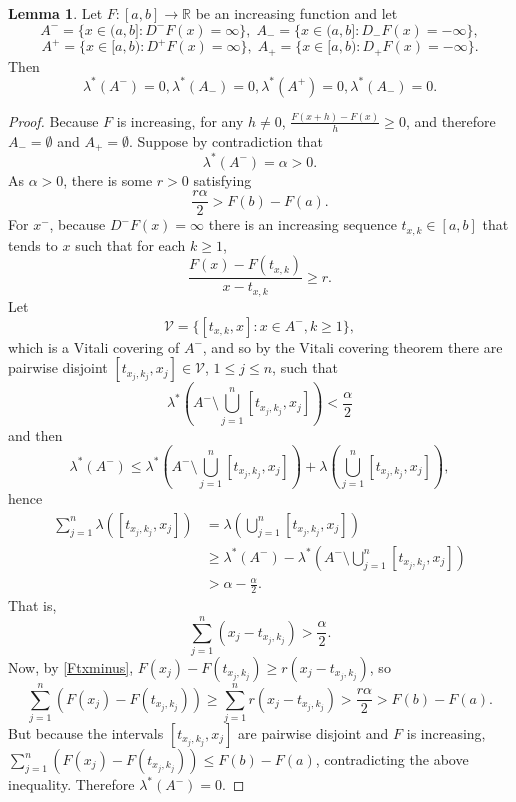 \documentclass{article}
\theoremstyle{definition}
\newtheorem{lemma}[theorem]{Lemma}
\theoremstyle{definition}
\begin{document}
\begin{lemma}
Let $F:[a,b] \to \mathbb{R}$ be an increasing function and let
\[
A^- = \{x \in (a,b]: D^-F(x) =\infty\},
\; A_-=\{x \in (a,b]: D_-F(x)=-\infty\},
\]
\[
A^+=\{x \in [a,b):D^+F(x)=\infty\},
\; A_+=\{x \in [a,b): D_+F(x)=-\infty\}.
\] 
Then
\[
\lambda^*(A^-)=0, \lambda^*(A_-)=0, \lambda^*(A^+)=0, \lambda^*(A_-)=0.
\]
\end{lemma}
\begin{proof}
Because $F$ is increasing, for any $h \neq 0$, $\frac{F(x+h)-F(x)}{h} \geq 0$, and therefore
$A_-=\emptyset$ and $A_+=\emptyset$. 
Suppose by contradiction that 
\[
\lambda^*(A^-) = \alpha>0.
\]
As $\alpha>0$, there is some $r>0$ satisfying
\[
\frac{r\alpha}{2} > F(b)-F(a).
\]
For $x^-$, because $D^-F(x)=\infty$ there is an increasing sequence
$t_{x,k} \in [a,b]$ that tends to $x$ such that for each $k \geq 1$,
\begin{equation}
\frac{F(x)-F(t_{x,k})}{x-t_{x,k}} \geq r.
\label{Ftxminus}
\end{equation}
Let
\[
\mathcal{V} = \{[t_{x,k},x]: x \in A^-, k \geq 1\},
\]
which is a Vitali covering of $A^-$, and so by the Vitali covering theorem there are pairwise
disjoint $[t_{x_j,k_j}, x_j] \in \mathcal{V}$, $1 \leq j \leq n$, such that
\[
\lambda^*\left(A^- \setminus \bigcup_{j=1}^n [t_{x_j,k_j},x_j]\right) < \frac{\alpha}{2}
\]
and then
\[
\lambda^*(A^-) \leq \lambda^*\left(A^- \setminus \bigcup_{j=1}^n [t_{x_j,k_j},x_j]\right)
+\lambda\left( \bigcup_{j=1}^n [t_{x_j,k_j},x_j]\right),
\]
hence
\begin{align*}
\sum_{j=1}^n \lambda( [t_{x_j,k_j},x_j])&=\lambda\left( \bigcup_{j=1}^n [t_{x_j,k_j},x_j]\right)\\
&\geq  \lambda^*(A^-)  -  \lambda^*\left(A^- \setminus \bigcup_{j=1}^n [t_{x_j,k_j},x_j]\right)\\
&>\alpha - \frac{\alpha}{2}.
\end{align*}
That is,
\[
\sum_{j=1}^n (x_j-t_{x_j,k_j}) > \frac{\alpha}{2}.
\]
Now, by \eqref{Ftxminus}, $F(x_j)-F(t_{x_j,k_j}) \geq r(x_j-t_{x_j,k_j})$, so
\[
\sum_{j=1}^n (F(x_j)-F(t_{x_j,k_j})) \geq
\sum_{j=1}^n r(x_j-t_{x_j,k_j}) > \frac{r\alpha}{2}>F(b)-F(a).
\]
But because the intervals $[t_{x_j,k_j},x_j]$ are pairwise disjoint and $F$ is increasing,
$\sum_{j=1}^n (F(x_j)-F(t_{x_j,k_j})) \leq F(b)-F(a)$, contradicting the above inequality.
Therefore $\lambda^*(A^-)=0$. 


\end{proof}
\end{document}
